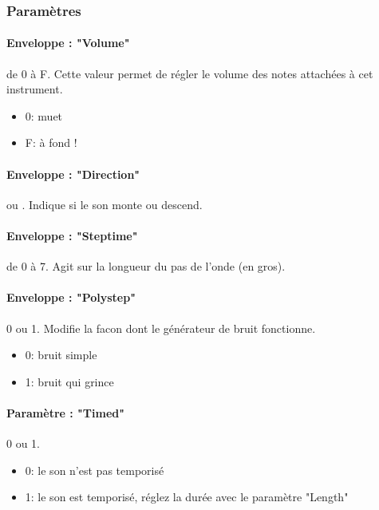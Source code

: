 \subsubsection{Paramètres}

\paragraph{Enveloppe : "Volume"} de 0 à F.
Cette valeur permet de régler le volume des notes attachées à cet instrument.
\medskip

\begin{itemize}
    \item{0: muet}
    \item{F: à fond !}
\end{itemize}

\paragraph{Enveloppe : "Direction"}  ou .
    Indique si le son monte ou descend.

\paragraph{Enveloppe : "Steptime"} de 0 à 7.
Agit sur la longueur du pas de l'onde (en gros).

\paragraph{Enveloppe : "Polystep"} 0 ou 1.
Modifie la facon dont le générateur de bruit fonctionne.
\medskip

\begin{itemize}
    \item{0: bruit simple}
    \item{1: bruit qui grince}
\end{itemize}

\paragraph{Paramètre : "Timed"} 0 ou 1.
\medskip

\begin{itemize}
        \item{0: le son n'est pas temporisé}
        \item{1: le son est temporisé, réglez la durée avec le paramètre "Length"}
    \end{itemize}


